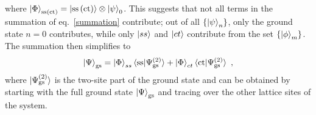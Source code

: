 \documentclass[reprint,superscriptaddress,floatfix]{revtex4-2}
\begin{document}
where \(\ket{\Phi}_\text{ss(ct)} = \ket{\text{ss}\left( \text{ct} \right)}\otimes\ket{\psi}_0 \).
This suggests that not all terms in the summation of eq.~\ref{summation} contribute; out of all \(\left\{ \ket{\psi}_n \right\} \), only the ground state \(n=0\) contributes, while only \(\ket{ss}\) and \(\ket{ct}\) contribute from the set \(\left\{ \ket{\phi}_m \right\} \). The summation then simplifies to
\begin{equation}\begin{aligned}
	\label{gs-ss}
	\ket{\Psi}_\text{gs} = \ket{\Phi}_{ss}\braket{\text{ss}|\Psi^{(2)}_\text{gs}} + \ket{\Phi}_{ct}\braket{\text{ct}|\Psi^{(2)}_\text{gs}}~,
\end{aligned}\end{equation}
where \(\ket{\Psi^{(2)}_\text{gs}}\) is the two-site part of the ground state and can be obtained by starting with the full ground state \(\ket{\Psi}_\text{gs}\) and tracing over the other lattice sites of the system.
\end{document}
